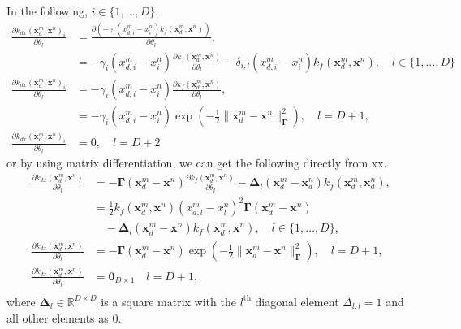 \documentclass[10pt,oneside,a4paper,notitlepage]{article}
\newcommand{\vect}[1]{\mathbf{#1}}
\begin{document}
In the following, $i\in\{1,\ldots, D\}$.
\begin{align}
\frac{\partial k_{dx}(\vect x_d^m, \vect x^n)_i}{\partial\theta_l}&=
\frac{\partial\left(-\gamma_i(x_{d,i}^m - x_i^n)k_f(\vect x_d^m, \vect x^n)\right)}{\partial\theta_l}, \\
&= -\gamma_i(x_{d,i}^m - x_i^n)\frac{\partial k_f(\vect x_d^m, \vect x^n)}{\partial\theta_l} - \delta_{i,l}(x_{d,i}^m - x_i^n)k_f(\vect x_d^m, \vect x^n), \quad l\in\{1,\ldots,D\} \\
\frac{\partial k_{dx}(\vect x_d^m, \vect x^n)_i}{\partial\theta_l}&= -\gamma_i(x_{d,i}^m - x_i^n)\frac{\partial k_f(\vect x_d^m, \vect x^n)}{\partial\theta_l} , \\
&= -\gamma_i(x_{d,i}^m - x_i^n)\exp\left(-\frac{1}{2}\|\vect x_d^m - \vect x^n\|_{\boldsymbol\Gamma}^2\right) ,\quad l=D+1, \\
\frac{\partial k_{dx}(\vect x_d^m, \vect x^n)_i}{\partial\theta_l}&=0,\quad l=D+2 
\end{align}
or by using matrix differentiation, we can get the following directly from xx. 
\begin{align}
\frac{\partial k_{dx}(\vect x_d^m, \vect x^n)}{\partial\theta_l}&= -\boldsymbol\Gamma (\vect x_d^m - \vect x^n)\frac{\partial k_f(\vect x_d^m, \vect x^n)}{\partial\theta_l} - \boldsymbol\Delta_l(\vect x_d^m - \vect x_d^n) k_f(\vect x_d^m, \vect x_d^n), \\ 
&= \frac{1}{2}k_f(\vect x_d^m, \vect x^n)(x_{d,l}^m - x_l^n)^2\boldsymbol\Gamma (\vect x_d^m - \vect x^n) \nonumber \\
&\quad- \boldsymbol\Delta_l(\vect x_d^m - \vect x^n) k_f(\vect x_d^m, \vect x^n),  \quad l\in\{1,\ldots,D\}, \\ 
\frac{\partial k_{dx}(\vect x_d^m, \vect x^n)}{\partial\theta_l}&= -\boldsymbol\Gamma (\vect x_d^m - \vect x^n)\exp\left(-\frac{1}{2}\|\vect x_d^m - \vect x^n\|_{\boldsymbol\Gamma}^2\right),  \quad l=D+1,\\ 
\frac{\partial k_{dx}(\vect x_d^m, \vect x^n)}{\partial\theta_l}&=\vect 0_{D\times 1} \quad l=D+1,\\ 
\end{align}
where $\boldsymbol\Delta_l\in\mathbb R ^{D\times D}$ is a square matrix with the $l^\mathrm{th}$ diagonal element $\Delta_{l,l} = 1$ and all other elements as 0. 
\end{document}
